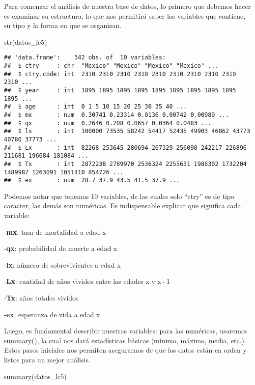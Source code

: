 \documentclass[
]{article}
\newenvironment{Shaded}{\begin{snugshade}}{\end{snugshade}}
\newcommand{\FunctionTok}[1]{\textcolor[rgb]{0.00,0.00,0.00}{#1}}
\newcommand{\NormalTok}[1]{#1}
\begin{document}
Para comenzar el análisis de nuestra base de datos, lo primero que
debemos hacer es examinar su estructura, lo que nos permitirá saber las
variables que contiene, su tipo y la forma en que se organizan.

\begin{Shaded}
\begin{Highlighting}[]
\FunctionTok{str}\NormalTok{(datos\_lc5)}
\end{Highlighting}
\end{Shaded}

\begin{verbatim}
## 'data.frame':    342 obs. of  10 variables:
##  $ ctry     : chr  "Mexico" "Mexico" "Mexico" "Mexico" ...
##  $ ctry.code: int  2310 2310 2310 2310 2310 2310 2310 2310 2310 2310 ...
##  $ year     : int  1895 1895 1895 1895 1895 1895 1895 1895 1895 1895 ...
##  $ age      : int  0 1 5 10 15 20 25 30 35 40 ...
##  $ mx       : num  0.30741 0.23314 0.0136 0.00742 0.00989 ...
##  $ qx       : num  0.2646 0.208 0.0657 0.0364 0.0483 ...
##  $ lx       : int  100000 73535 58242 54417 52435 49903 46862 43773 40780 37773 ...
##  $ Lx       : int  82268 253645 280694 267329 256098 242217 226896 211681 196684 181084 ...
##  $ Tx       : int  2872238 2789970 2536324 2255631 1988302 1732204 1489987 1263091 1051410 854726 ...
##  $ ex       : num  28.7 37.9 43.5 41.5 37.9 ...
\end{verbatim}

Podemos notar que tenemos 10 variables, de las cuales solo ``ctry'' es
de tipo caracter, las demás son numéricas. Es indispensable explicar que
significa cada variable:

-\textbf{mx}: tasa de mortalidad a edad x

-\textbf{qx}: probabilidad de muerte a edad x

-\textbf{lx}: número de sobrevivientes a edad x

-\textbf{Lx}: cantidad de años vividos entre las edades x y x+1

-\textbf{Tx}: años totales vividos

-\textbf{ex}: esperanza de vida a edad x

Luego, es fundamental describir nuestras variables: para las numéricas,
usaremos summary(), la cual nos dará estadísticas básicas (mínimo,
máximo, media, etc.). Estos pasos iniciales nos permiten asegurarnos de
que los datos están en orden y listos para un mejor análisis.

\begin{Shaded}
\begin{Highlighting}[]
\FunctionTok{summary}\NormalTok{(datos\_lc5)}
\end{Highlighting}
\end{Shaded}
\end{document}
